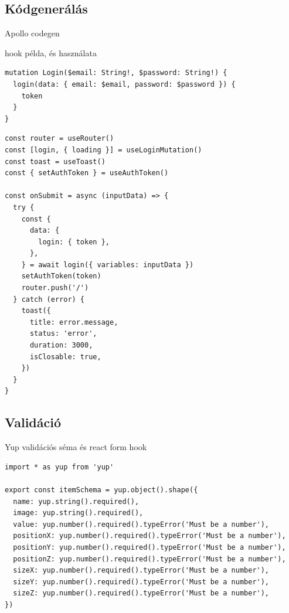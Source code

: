 
\subsection{Kódgenerálás}

Apollo codegen

hook példa, és használata

\begin{lstlisting}[style=ES6, caption={GraphQL Shield}]
mutation Login($email: String!, $password: String!) {
  login(data: { email: $email, password: $password }) {
    token
  }
}
\end{lstlisting}

\begin{lstlisting}[style=ES6, caption={Bejelentkezés kódrészlet}]
const router = useRouter()
const [login, { loading }] = useLoginMutation()
const toast = useToast()
const { setAuthToken } = useAuthToken()

const onSubmit = async (inputData) => {
  try {
    const {
      data: {
        login: { token },
      },
    } = await login({ variables: inputData })
    setAuthToken(token)
    router.push('/')
  } catch (error) {
    toast({
      title: error.message,
      status: 'error',
      duration: 3000,
      isClosable: true,
    })
  }
}
\end{lstlisting}

\subsection{Validáció}

Yup validációs séma és react form hook

\begin{lstlisting}[style=ES6, caption={Esköz validációs séma}]
import * as yup from 'yup'

export const itemSchema = yup.object().shape({
  name: yup.string().required(),
  image: yup.string().required(),
  value: yup.number().required().typeError('Must be a number'),
  positionX: yup.number().required().typeError('Must be a number'),
  positionY: yup.number().required().typeError('Must be a number'),
  positionZ: yup.number().required().typeError('Must be a number'),
  sizeX: yup.number().required().typeError('Must be a number'),
  sizeY: yup.number().required().typeError('Must be a number'),
  sizeZ: yup.number().required().typeError('Must be a number'),
})
\end{lstlisting}


